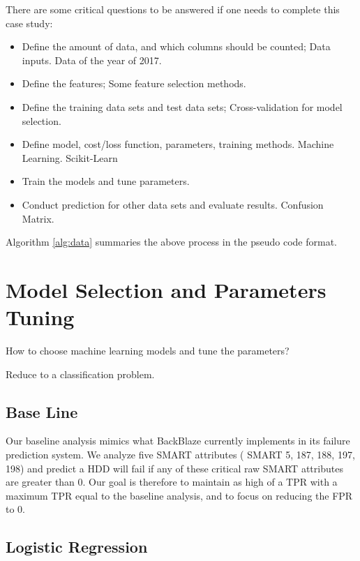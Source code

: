 \documentclass[12pt,a4paper,english]{amsart}
\begin{document}

There are some critical questions to be answered if one needs to complete this case study:

\begin{itemize}
	\item Define the amount of data, and which columns should be counted; Data inputs.
			Data of the year of 2017.
	\item Define the features; Some feature selection methods.
	\item Define the training data sets and test data sets; Cross-validation for model selection.
	\item Define model, cost/loss function, parameters, training methods. Machine Learning. Scikit-Learn
	\item Train the models and tune parameters.
	\item Conduct prediction for other data sets and evaluate results. Confusion Matrix.
\end{itemize}
Algorithm \ref{alg:data} summaries the above process in the pseudo code format.


%
\section{Model Selection and Parameters Tuning}

How to choose machine learning models and tune the parameters?

Reduce to a classification problem.


\subsection*{Base Line}

Our baseline analysis mimics what BackBlaze currently implements in its failure prediction system. We analyze five SMART attributes ( SMART 5, 187, 188, 197, 198) and predict a HDD will fail if any of these critical raw SMART attributes are greater than 0.
Our goal is therefore to maintain as high of a TPR with a maximum TPR equal to the baseline analysis, and to focus on reducing the FPR to 0.

\subsection*{Logistic Regression}
\end{document}
